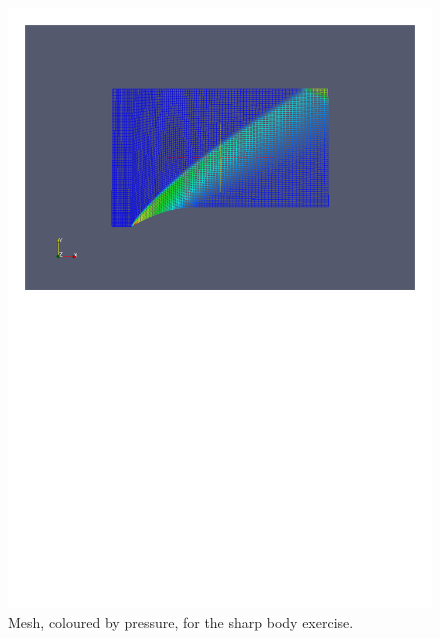 \begin{figure}[htbp]
\begin{center}
\includegraphics[width=\textwidth, viewport=24 446 570 818]{../2D/sharp/sharp_mesh.pdf}
\end{center}
\caption{Mesh, coloured by pressure, for the sharp body exercise.}
\label{sharp-mesh-fig}
\end{figure}

